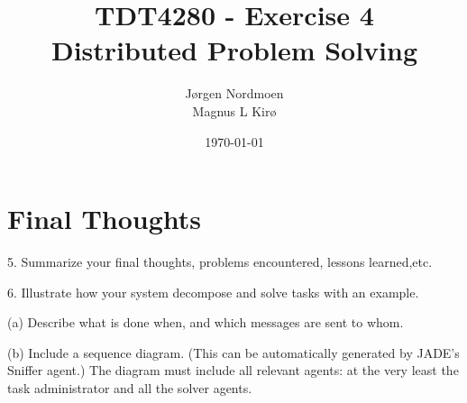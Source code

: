 \documentclass[12pt, a4paper]{article}
\title{
TDT4280 - Exercise 4 \\
Distributed Problem Solving
}
\author{
	Jørgen Nordmoen \\
        Magnus L Kirø \\
}
\date{\today}
\begin{document}
\maketitle
{}









\section{Final Thoughts}
5. Summarize your final thoughts, problems encountered, lessons learned,etc.

6. Illustrate how your system decompose and solve tasks with an example.

(a) Describe what is done when, and which messages are sent to whom.

(b) Include a sequence diagram. (This can be automatically generated by JADE's
Sniffer agent.) 
The diagram must include all relevant agents: at the very least the task administrator and all the solver agents.


\end{document}
